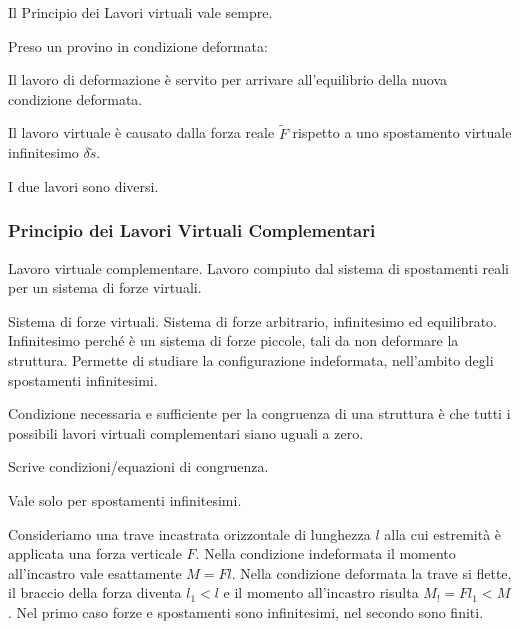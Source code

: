 Il Principio dei Lavori virtuali vale sempre.

\begin{esempioBox}
Preso un provino in condizione deformata:
\begin{compactitem}
    \item Il lavoro di deformazione è servito per arrivare all'equilibrio della nuova condizione deformata.
    \item Il lavoro virtuale è causato dalla forza reale $\tilde{F}$ rispetto a uno spostamento virtuale infinitesimo $\delta \tilde{s}$.
\end{compactitem}
I due lavori sono diversi.

\end{esempioBox}



\subsubsection*{Principio dei Lavori Virtuali Complementari}
\begin{definizioneBox}
    Lavoro virtuale complementare. Lavoro compiuto dal sistema di spostamenti reali per un sistema di forze virtuali.
\end{definizioneBox}
\begin{definizioneBox}
    Sistema di forze virtuali. Sistema di forze arbitrario, infinitesimo ed equilibrato.\\
    Infinitesimo perché è un sistema di forze piccole, tali da non deformare la struttura. Permette di studiare la configurazione indeformata, nell'ambito degli spostamenti infinitesimi.
\end{definizioneBox}

\begin{enunciatoBox}
    Condizione necessaria e sufficiente per la congruenza di una struttura è che tutti i possibili lavori virtuali complementari siano uguali a zero.

\end{enunciatoBox}

\begin{compactitem}
    \item Scrive condizioni/equazioni di congruenza.
    \item Vale solo per spostamenti infinitesimi.
\end{compactitem}

\begin{esempioBox}
    Consideriamo una trave incastrata orizzontale di lunghezza $l$ alla cui estremità è applicata una forza verticale $F$.
    Nella condizione indeformata il momento all'incastro vale esattamente $ M = Fl$.
    Nella condizione deformata la trave si flette, il braccio della forza diventa $l_1<l$ e il momento all'incastro risulta $M_! = Fl_1<M$.
    Nel primo caso forze e spostamenti sono infinitesimi, nel secondo sono finiti.
\end{esempioBox}








